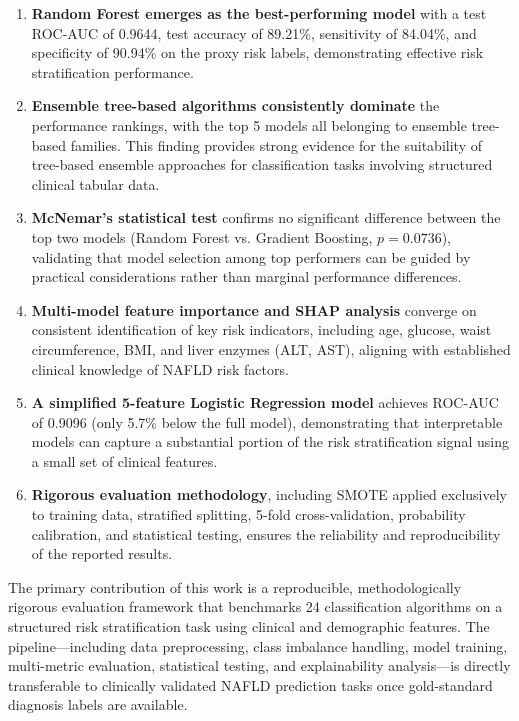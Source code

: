 \documentclass[conference,10pt]{IEEEtran}
\begin{document}
\begin{enumerate}
    \item \textbf{Random Forest emerges as the best-performing model} with a test ROC-AUC of 0.9644, test accuracy of 89.21\%, sensitivity of 84.04\%, and specificity of 90.94\% on the proxy risk labels, demonstrating effective risk stratification performance.

    \item \textbf{Ensemble tree-based algorithms consistently dominate} the performance rankings, with the top 5 models all belonging to ensemble tree-based families. This finding provides strong evidence for the suitability of tree-based ensemble approaches for classification tasks involving structured clinical tabular data.

    \item \textbf{McNemar's statistical test} confirms no significant difference between the top two models (Random Forest vs. Gradient Boosting, $p = 0.0736$), validating that model selection among top performers can be guided by practical considerations rather than marginal performance differences.

    \item \textbf{Multi-model feature importance and SHAP analysis} converge on consistent identification of key risk indicators, including age, glucose, waist circumference, BMI, and liver enzymes (ALT, AST), aligning with established clinical knowledge of NAFLD risk factors.

    \item \textbf{A simplified 5-feature Logistic Regression model} achieves ROC-AUC of 0.9096 (only 5.7\% below the full model), demonstrating that interpretable models can capture a substantial portion of the risk stratification signal using a small set of clinical features.

    \item \textbf{Rigorous evaluation methodology}, including SMOTE applied exclusively to training data, stratified splitting, 5-fold cross-validation, probability calibration, and statistical testing, ensures the reliability and reproducibility of the reported results.
\end{enumerate}

The primary contribution of this work is a reproducible, methodologically rigorous evaluation framework that benchmarks 24 classification algorithms on a structured risk stratification task using clinical and demographic features. The pipeline---including data preprocessing, class imbalance handling, model training, multi-metric evaluation, statistical testing, and explainability analysis---is directly transferable to clinically validated NAFLD prediction tasks once gold-standard diagnosis labels are available.
\end{document}
